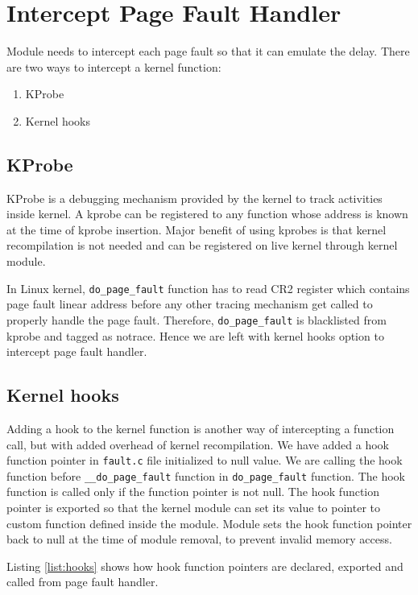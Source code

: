 \section{Intercept Page Fault Handler}
Module needs to intercept each page fault so that it can emulate the delay. There are two ways to intercept a kernel function:
\begin{enumerate}
	\item KProbe
	\item Kernel hooks
\end{enumerate}

\subsection{KProbe}

KProbe \cite{kprobe} is a debugging mechanism provided by the kernel to track activities inside kernel. A kprobe can be registered to any function whose address is known at the time of kprobe insertion. Major benefit of using kprobes is that kernel recompilation is not needed and can be registered on live kernel through kernel module.

In Linux kernel, \verb|do_page_fault| function has to read CR2 register which contains page fault linear address before any other tracing mechanism get called to properly handle the page fault. Therefore, \verb|do_page_fault| is blacklisted from kprobe and tagged as notrace. Hence we are left with kernel hooks option to intercept page fault handler.

\subsection{Kernel hooks}
Adding a hook to the kernel function is another way of intercepting a function call, but with added overhead of kernel recompilation. We have added a hook function pointer in \verb|fault.c| file initialized to null value. We are calling the hook function before \verb|__do_page_fault| function in \verb|do_page_fault| function. The hook function is called only if the function pointer is not null. The hook function pointer is exported so that the kernel module can set its value to pointer to custom function defined inside the module. Module sets the hook function pointer back to null at the time of module removal, to prevent invalid memory access.

Listing \ref{list:hooks} shows how hook function pointers are declared, exported and called from page fault handler.


